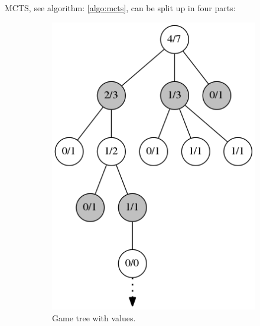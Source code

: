 \documentclass[10pt,letterpaper]{article}
\begin{document}
MCTS, see algorithm: \ref{algo:mcts}, can be split up in four parts:

\begin{figure}
    \centering
    \begin{subfigure}{0.23\textwidth}
    \includegraphics[width=\textwidth]{images/gametree-values}
    \caption{Game tree with values.}
    \label{fig:mcts-gametree-values} 	
    \end{subfigure}%
    \unskip\ \vrule\
    \begin{subfigure}{0.23\textwidth}

\end{subfigure}
\end{figure}
\end{document}
